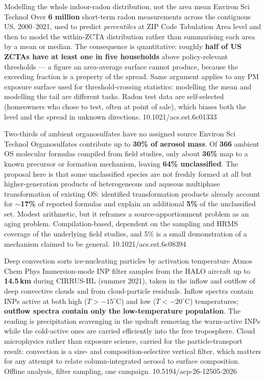\documentclass[10pt]{article}
\begin{document}
{Modelling the whole indoor-radon distribution, not the area mean}
{Environ Sci Technol}
{Over \textbf{6 million} short-term radon measurements across the contiguous US,
2000--2021, used to predict \emph{percentiles} at ZIP Code Tabulation Area level and then
to model the within-ZCTA distribution rather than summarising each area by a mean or
median. The consequence is quantitative: roughly \textbf{half of US ZCTAs have at least one
in five households} above policy-relevant thresholds --- a figure an area-average surface
cannot produce, because the exceeding fraction is a property of the spread. Same argument
applies to any PM exposure surface used for threshold-crossing statistics: modelling the
mean and modelling the tail are different tasks. Radon test data are self-selected
(homeowners who chose to test, often at point of sale), which biases both the level and
the spread in unknown directions.}
{10.1021/acs.est.6c01333}

{Two-thirds of ambient organosulfates have no assigned source}
{Environ Sci Technol}
{Organosulfates contribute up to \textbf{30\% of aerosol mass}. Of \textbf{366} ambient OS
molecular formulas compiled from field studies, only about \textbf{36\%} map to a known
precursor or formation mechanism, leaving \textbf{64\% unclassified}. The proposal here is
that some unclassified species are not freshly formed at all but higher-generation products
of heterogeneous and aqueous multiphase transformation of existing OS: identified
transformation products already account for \textbf{$\sim$17\%} of reported formulas and
explain an additional \textbf{5\%} of the unclassified set. Modest arithmetic, but it
reframes a source-apportionment problem as an aging problem. Compilation-based, dependent
on the sampling and HRMS coverage of the underlying field studies, and 5\% is a small
demonstration of a mechanism claimed to be general.}
{10.1021/acs.est.6c08394}

{Deep convection sorts ice-nucleating particles by activation temperature}
{Atmos Chem Phys}
{Immersion-mode INP filter samples from the HALO aircraft up to \textbf{14.5\,km} during
CIRRUS-HL (summer 2021), taken in the inflow and outflow of deep convective clouds and
from cloud-particle residuals. Inflow spectra contain INPs active at both high
($T>-15^{\circ}$C) and low ($T<-20^{\circ}$C) temperatures; \textbf{outflow spectra contain
only the low-temperature population}. The reading is precipitation scavenging in the
updraft removing the warm-active INPs while the cold-active ones are carried efficiently
into the free troposphere. Cloud microphysics rather than exposure science, carried for the
particle-transport result: convection is a size- and composition-selective vertical filter,
which matters for any attempt to relate column-integrated aerosol to surface composition.
Offline analysis, filter sampling, one campaign.}
{10.5194/acp-26-12505-2026}
\end{document}
